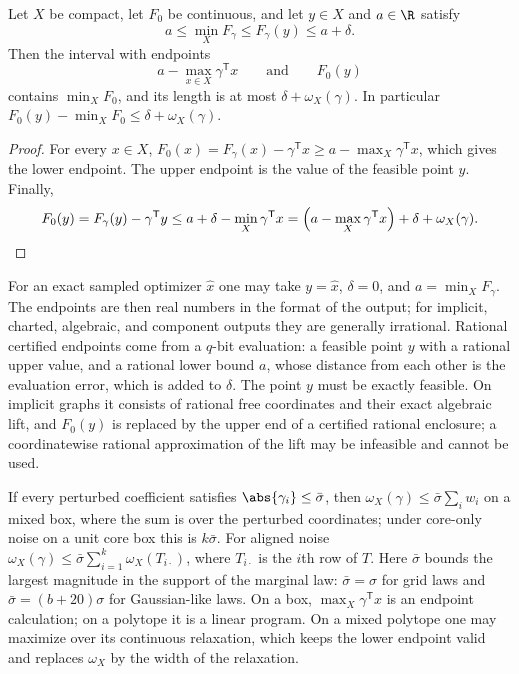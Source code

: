 \begin{proposition}\label{prop:model:regret}
Let $X$ be compact, let $F_0$ be continuous, and let $y\in X$ and $a\in\R$
satisfy
\[
 a\le\min_XF_\gamma\le F_\gamma(y)\le a+\delta.
\]
Then the interval with endpoints
\[
 a-\max_{x\in X}\gamma^{\mathsf T}x\qquad\text{and}\qquad F_0(y)
\]
contains $\min_XF_0$, and its length is at most $\delta+\omega_X(\gamma)$. In
particular $F_0(y)-\min_XF_0\le\delta+\omega_X(\gamma)$.
\end{proposition}

\begin{proof}
For every $x\in X$, $F_0(x)=F_\gamma(x)-\gamma^{\mathsf T}x\ge
a-\max_X\gamma^{\mathsf T}x$, which gives the lower endpoint. The upper
endpoint is the value of the feasible point $y$. Finally,
\[
 F_0(y)=F_\gamma(y)-\gamma^{\mathsf T}y\le a+\delta-\min_X\gamma^{\mathsf T}x
 =\Bigl(a-\max_X\gamma^{\mathsf T}x\Bigr)+\delta+\omega_X(\gamma).\qedhere
\]
\end{proof}

For an exact sampled optimizer $\hat x$ one may take $y=\hat x$, $\delta=0$,
and $a=\min_XF_\gamma$. The endpoints are then real numbers in the format of
the output; for implicit, charted, algebraic, and component outputs they
are generally irrational. Rational certified endpoints come from a
$q$-bit evaluation: a feasible point $y$ with a rational upper value, and a
rational lower bound $a$, whose distance from each other is the evaluation
error, which is added to $\delta$. The point $y$ must be exactly feasible.
On implicit graphs it consists of rational free coordinates and their exact
algebraic lift, and $F_0(y)$ is replaced by the upper end of a certified
rational enclosure; a coordinatewise rational approximation of the lift may
be infeasible and cannot be used.

If every perturbed coefficient satisfies $\abs{\gamma_i}\le\bar\sigma$, then
$\omega_X(\gamma)\le\bar\sigma\sum_iw_i$ on a mixed box, where the sum is
over the perturbed coordinates; under core-only noise on a unit core box this
is $k\bar\sigma$. For aligned noise $\omega_X(\gamma)\le\bar\sigma
\sum_{i=1}^k\omega_X(T_{i\cdot})$, where $T_{i\cdot}$ is the $i$th row of
$T$. Here $\bar\sigma$ bounds the largest magnitude in the support of the
marginal law: $\bar\sigma=\sigma$ for grid laws and
$\bar\sigma=(b+20)\sigma$ for Gaussian-like laws. On a box,
$\max_X\gamma^{\mathsf T}x$ is an endpoint calculation; on a polytope it is a
linear program. On a mixed polytope one may maximize over its continuous
relaxation, which keeps the lower endpoint valid and replaces $\omega_X$ by
the width of the relaxation.


